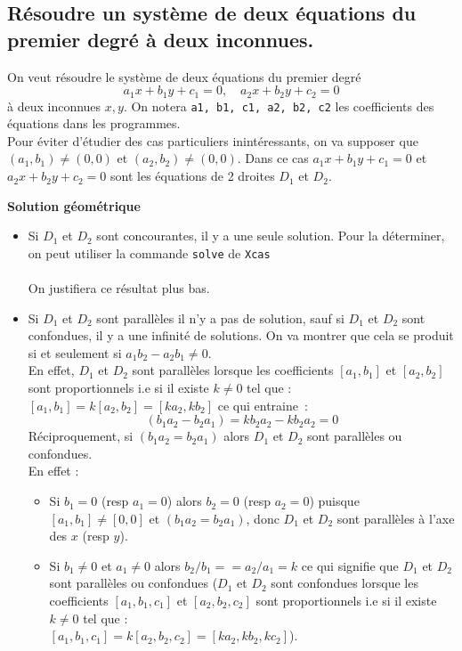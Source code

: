 \documentclass[12pt,a4paper]{book}
\begin{document}
\begin{giacjshere}
\section{R\'esoudre un syst\`eme de deux \'equations du premier degr\'e \`a deux inconnues.}
On veut r\'esoudre le syst\`eme de deux \'equations du premier degr\'e \\
$$ a_1 x+b_1 y+c_1=0, \quad a_2x+b_2y+c_2=0$$
\`a deux inconnues $x,y$. On notera {\tt a1, b1, c1, a2, b2, c2} les
coefficients des \'equations dans les programmes.\\
Pour \'eviter d'\'etudier des cas particuliers inint\'eressants, on va 
supposer que $(a_1,b_1)\neq (0,0)$ et $(a_2,b_2) \neq (0,0)$. 
Dans ce cas $a_1 x+b_1 y+c_1=0$ et $ a_2x+b_2y+c_2=0$
sont les \'equations de 2 droites $D_1$ et $D_2$.

{\bf Solution g\'eom\'etrique}
\begin{itemize}
\item
Si $D_1$ et $D_2$ sont concourantes, il y a une seule solution.
Pour la d\'eterminer, on peut utiliser la commande 
{\tt solve} de {\tt Xcas}\\
\\
On justifiera ce r\'esultat plus bas.
\item Si $D_1$ et $D_2$ sont parall\`eles il n'y a pas de solution, sauf si
$D_1$ et $D_2$ sont confondues, il y a une infinit\'e de solutions. On
va montrer que cela se produit si et seulement si $a_1 b_2-a_2b_1 \neq 0$.\\
En effet, 
$D_1$ et $D_2$ sont  parall\`eles lorsque les coefficients $ [a_1,b_1]$ 
et $ [a_2,b_2]$ sont proportionnels i.e si il existe $ k\neq0$ tel que :\\
 $ [a_1,b_1]=k[a_2,b_2]=[ka_2,kb_2]$ ce qui entraine~:
$$ (b_1a_2-b_2a_1)=kb_2a_2-kb_2a_2=0$$
R\'eciproquement, si $ (b_1a_2=b_2a_1)$ alors $D_1$ et $D_2$ sont 
parall\`eles ou confondues.\\
En effet :
\begin{itemize}
\item Si $ b_1=0$ (resp $ a_1=0$) alors $ b_2=0$ (resp $ a_2=0$) puisque 
$ [a_1,b_1]\neq[0,0]$ et $ (b_1a_2=b_2a_1)$,  donc 
$D_1$ et $D_2$ sont parall\`eles \`a l'axe des $ x$  (resp  $ y$).
\item 
Si $ b_1\neq0$ et $ a_1\neq0$ alors $ b_2/b_1==a_2/a_1=k$ ce qui signifie que
$D_1$ et $D_2$ sont parall\`eles ou confondues 
($D_1$ et $D_2$ sont confondues lorsque les coefficients $ [a_1,b_1,c_1]$ 
et $ [a_2,b_2,c_2]$ sont proportionnels i.e si il existe $ k\neq0$ tel que :\\
 $ [a_1,b_1,c_1]=k[a_2,b_2,c_2]=[ka_2,kb_2,kc_2]$).
\end{itemize}
\end{itemize}


\end{giacjshere}
\end{document}
